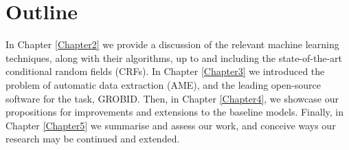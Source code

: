 \section{Outline}

In Chapter \ref{Chapter2} we provide a discussion of the relevant machine learning techniques, along with their algorithms, up to and including the state-of-the-art conditional random fields (CRFs). In Chapter \ref{Chapter3} we introduced the problem of automatic data extraction (AME), and the leading open-source software for the task, GROBID. Then, in Chapter \ref{Chapter4}, we showcase our propositions for improvements and extensions to the baseline models. Finally, in Chapter \ref{Chapter5} we summarise and assess our work, and conceive ways our research may be continued and extended.